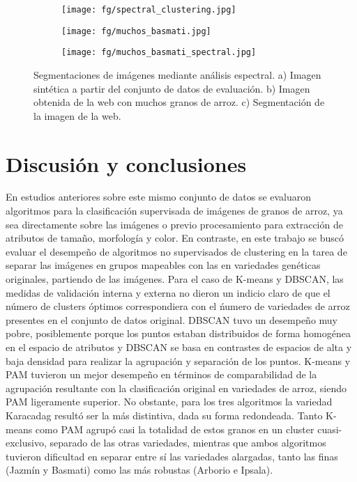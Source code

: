 \documentclass{article}
\begin{document}
\begin{figure} [!htb]
	\centering
	\begin{subfigure}[c]{0.3\textwidth}
	   \texttt{[image: fg/spectral\_clustering.jpg]}
      \caption{}
      \label{fg:espectral_granos}
    \end{subfigure}
    \begin{subfigure}[c]{0.3\textwidth}
	   \texttt{[image: fg/muchos\_basmati.jpg]}
      \caption{}
      \label{fg:espectral_web}
	\end{subfigure}
	\begin{subfigure}[c]{0.3\textwidth}
	   \texttt{[image: fg/muchos\_basmati\_spectral.jpg]}
      \caption{}
      \label{fg:espectral_web_segmentada}
	\end{subfigure}
	\caption{Segmentaciones de imágenes mediante análisis espectral. a) Imagen sintética a partir del conjunto de datos de evaluación. b) Imagen obtenida de la web con muchos granos de arroz. c) Segmentación de la imagen de la web.}	
\label{fg:espectral}
\end{figure}


\section{Discusión y conclusiones}
En estudios anteriores sobre este mismo conjunto de datos se evaluaron algoritmos para la clasificación supervisada de imágenes de granos de arroz, ya sea directamente sobre las imágenes o previo procesamiento para extracción de atributos de tamaño, morfología y color. En contraste, en este trabajo se buscó evaluar el desempeño de algoritmos no supervisados de clustering en la tarea de separar las imágenes en grupos mapeables con las en variedades genéticas originales, partiendo de las imágenes. 
Para el caso de K-means y DBSCAN, las medidas de validación interna y externa no dieron un indicio claro de que el número de clusters óptimos correspondiera con el ńumero de variedades de arroz presentes en el conjunto de datos original. DBSCAN tuvo un desempeño muy pobre, posiblemente porque los puntos estaban distribuidos de forma homogénea en el espacio de atributos y DBSCAN se basa en contrastes de espacios de alta y baja densidad para realizar la agrupación y separación de los puntos. K-means y PAM tuvieron un mejor desempeño en términos de comparabilidad de la agrupación resultante con la clasificación original en variedades de arroz, siendo PAM ligeramente superior. No obstante, para los tres algoritmos la variedad Karacadag resultó ser la más distintiva, dada su forma redondeada. Tanto K-means como PAM agrupó casi la totalidad de estos granos en un cluster cuasi-exclusivo, separado de las otras variedades, mientras que ambos algoritmos tuvieron dificultad en separar entre sí las variedades alargadas, tanto las finas (Jazmín y Basmati) como las más robustas (Arborio e Ipsala).
\end{document}
